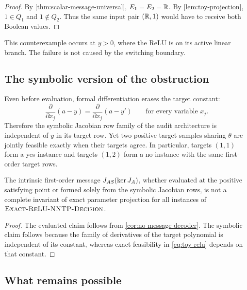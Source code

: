 \begin{proof}
By \cref{thm:scalar-message-universal}, \(E_1=E_2=\mathbb{R}\).  By
\cref{lem:toy-projection}, \(1\in Q_1\) and \(1\notin Q_2\).  Thus the same
input pair \((\mathbb{R},1)\) would have to receive both Boolean values.
\end{proof}

This counterexample occurs at \(y>0\), where the ReLU is on its active linear
branch.  The failure is not caused by the switching boundary.

\subsection{The symbolic version of the obstruction}

Even before evaluation, formal differentiation erases the target constant:
\begin{equation}
  \frac{\partial}{\partial x_j}(a-y)
  =\frac{\partial}{\partial x_j}(a-y')
  \qquad\text{for every variable }x_j.
\end{equation}
Therefore the symbolic Jacobian row family of the audit architecture is
independent of \(y\) in its target row.  Yet two positive-target samples sharing
\(\theta\) are jointly feasible exactly when their targets agree.  In
particular, targets \((1,1)\) form a yes-instance and targets \((1,2)\) form a
no-instance with the same first-order target rows.

\begin{theorem}
\label{thm:cotangent-only-false}
The intrinsic first-order message
\(J_{AS}(\operatorname{ker} J_A)\), whether evaluated at the positive satisfying point or
formed solely from the symbolic Jacobian rows, is not a complete invariant of
exact parameter projection for all instances of \(\textnormal{\textsc{Exact-ReLU-NNTP-Decision}}\).
\end{theorem}

\begin{proof}
The evaluated claim follows from \cref{cor:no-message-decoder}.  The symbolic
claim follows because the family of derivatives of the target polynomial is
independent of its constant, whereas exact feasibility in
\cref{eq:toy-relu} depends on that constant.
\end{proof}

\subsection{What remains possible}


